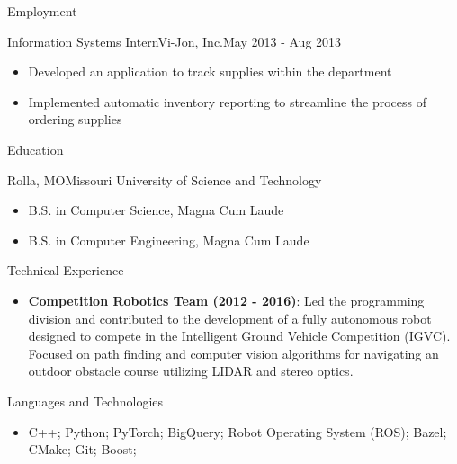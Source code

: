 \documentclass[]{mcdowellcv}
\begin{document}
\begin{cvsection}{Employment}
\begin{vijon}
    \begin{cvsubsection}{Information Systems Intern}{Vi-Jon, Inc.}{May 2013 - Aug 2013}
        \begin{itemize}
            \item Developed an application to track supplies within the department
            \item Implemented automatic inventory reporting to streamline the process of ordering supplies
        \end{itemize}
    \end{cvsubsection}
\end{vijon}

\end{cvsection}

\begin{cvsection}{Education}
    \begin{cvsubsection}[2]{Rolla, MO}{Missouri University of Science and Technology}{}
        \begin{itemize}
            \item B.S. in Computer Science, Magna Cum Laude
            \item B.S. in Computer Engineering, Magna Cum Laude
        \end{itemize}
    \end{cvsubsection}
\end{cvsection} 

\begin{technical-experience}
    \begin{cvsection}{Technical Experience}
        \begin{cvsubsection}{}{}{}  
            \begin{itemize} 
                \item \textbf{Competition Robotics Team (2012 - 2016)}: Led the programming division and contributed to the development of a fully autonomous robot designed to compete in the Intelligent Ground Vehicle Competition (IGVC). Focused on path finding and computer vision algorithms for navigating an outdoor obstacle course utilizing LIDAR and stereo optics.
            \end{itemize}
        \end{cvsubsection}
    \end{cvsection}
\end{technical-experience}

\begin{cvsection}{Languages and Technologies}
    \begin{cvsubsection}{}{}{}  
        \begin{itemize}
            \item C++; Python; PyTorch; BigQuery; Robot Operating System (ROS); Bazel; CMake; Git; Boost;
        \end{itemize}
    \end{cvsubsection}
\end{cvsection}
\end{document}
